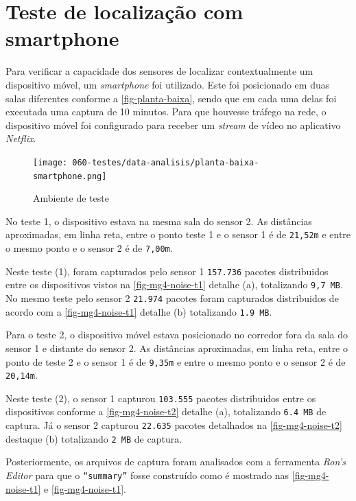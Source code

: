 \section{Teste de localização com smartphone}
\label{sec:teste-smarphone}

Para verificar a capacidade dos sensores de localizar contextualmente um
dispositivo móvel, um \emph{smartphone} foi utilizado. Este foi posicionado em
duas salas diferentes conforme a \autoref{fig-planta-baixa}, sendo que em cada
uma delas foi executada uma captura de 10 minutos. Para que houvesse tráfego na
rede, o dispositivo móvel foi configurado para receber um \emph{stream} de vídeo
no aplicativo \emph{Netflix}.

\begin{figure}[htb]
	\caption{\label{fig-planta-baixa}Ambiente de teste}
	\begin{center}
		\texttt{[image: 060-testes/data-analisis/planta-baixa-smartphone.png]}
	\end{center}
\end{figure}

No teste 1, o dispositivo estava na mesma sala do sensor 2. As distâncias
aproximadas, em linha reta, entre o ponto teste 1 e o sensor 1 é de
\texttt{21,52m} e entre o mesmo ponto e o sensor 2 é de \texttt{7,00m}.

Neste teste (1), foram capturados pelo sensor 1 \texttt{157.736} pacotes
distribuidos entre os dispositivos vistos na \autoref{fig-mg4-noise-t1} detalhe
(a), totalizando \texttt{9,7 MB}.
No mesmo teste pelo sensor 2 \texttt{21.974}
pacotes foram capturados distribuidos de acordo com a \autoref{fig-mg4-noise-t1}
detalhe (b) totalizando \texttt{1.9 MB}.

Para o teste 2, o dispositivo móvel estava posicionado no corredor fora da sala
do sensor 1 e distante do sensor 2. As distâncias aproximadas, em linha reta,
entre o ponto de teste 2 e o sensor 1 é de \texttt{9,35m} e entre o mesmo ponto
e o sensor 2 é de \texttt{20,14m}.

Neste teste (2), o sensor 1 capturou \texttt{103.555} pacotes distribuidos entre
os dispositivos conforme a \autoref{fig-mg4-noise-t2} detalhe (a), totalizando
\texttt{6.4 MB} de captura.
Já o sensor 2 capturou \texttt{22.635} pacotes detalhados na
\autoref{fig-mg4-noise-t2} destaque (b) totalizando \texttt{2 MB} de captura.

Posteriormente, os arquivos de captura foram analisados com a ferramenta
\emph{Ron’s Editor} para que o \texttt{``summary''} fosse construído como é
mostrado nas \autoref{fig-mg4-noise-t1} e \autoref{fig-mg4-noise-t1}.

